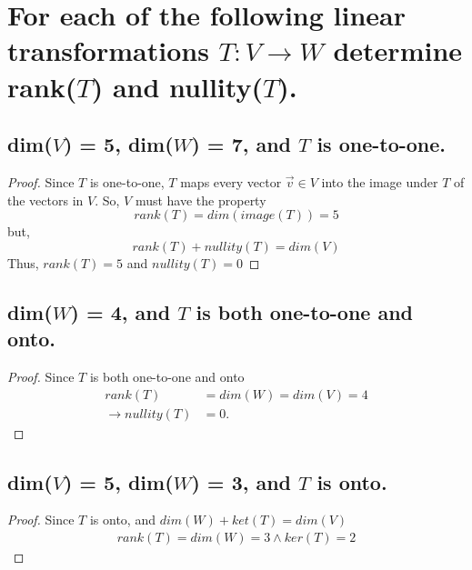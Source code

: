 \documentclass[../main.tex]{subfiles}
\begin{document}
\section[Problem 1]{For each of the following linear transformations $T: V \to W$ determine rank($T$) and nullity($T$).}
\subsection{dim($V$) = 5, dim($W$) = 7, and $T$ is one-to-one.}
\begin{proof}
        Since $T$ is one-to-one, $T$ maps every vector $\displaystyle \vec{v} \in V$ into the image under $T$ of the vectors in $V$. So, $V$ must have the property
        $$
                rank(T)=dim(image(T))=5
        $$
        but,
        $$
                rank(T)+nullity(T)=dim(V)
        $$
        Thus, $rank(T)=5$ and $nullity(T)=0$
\end{proof}

\subsection{dim($W$) = 4, and $T$ is both one-to-one and onto.}
\begin{proof}
        Since $\displaystyle T$ is both one-to-one and onto
        \begin{align*}
                \displaystyle rank( T)               & =dim( W) =dim( V) =4 \\
                \rightarrow\displaystyle nullity( T) & =0.
        \end{align*}
\end{proof}
\subsection{dim($V$) = 5, dim($W$) = 3, and $T$ is onto.}
\begin{proof}
        Since $\displaystyle T$ is onto, and $dim( W) + ket( T) = dim( V)$
        \begin{align*}
                \displaystyle rank( T) = dim( W) = 3 \land \displaystyle ker( T) =2
        \end{align*}
\end{proof}
\end{document}
